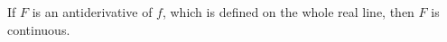 \documentclass{ximera}
\author{Steven Gubkin}
\begin{document}
\begin{exercise}



If $F$ is an antiderivative of $f$, which is defined on the whole real line, then $F$ is continuous.

	\begin{multipleChoice}	
	\end{multipleChoice}

\end{exercise}
\end{document}
